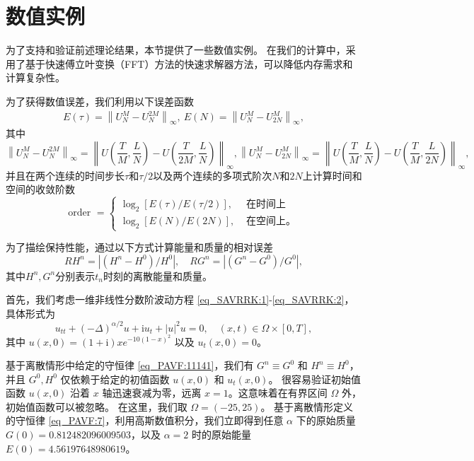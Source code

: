 \section{数值实例}\label{Section_PAVF: 4}
为了支持和验证前述理论结果，本节提供了一些数值实例。
在我们的计算中，采用了基于快速傅立叶变换（FFT）方法的快速求解器方法，可以降低内存需求和计算复杂性。

为了获得数值误差，我们利用以下误差函数
\begin{align}\label{eq_PAVF:103}
E(\tau)=\left\|U_{N}^{M}-U_{N}^{2 M}\right\|_{\infty},~E(N)=\left\|U_{N}^{M}-U_{2 N}^{M}\right\|_{\infty},
\end{align}
其中
$$\left\|U_{N}^{M}-U_{N}^{2 M}\right\|_{\infty}=\left\|U\left(\frac{T}{M}, \frac{L}{N}\right)-U\left(\frac{T}{2 M}, \frac{L}{N}\right)\right\|_{\infty},\left\|U_{N}^{M}-U_{2 N}^{M}\right\|_{\infty}=\left\|U\left(\frac{T}{M}, \frac{L}{N}\right)-U\left(\frac{T}{M}, \frac{L}{2 N}\right)\right\|_{\infty},$$
并且在两个连续的时间步长$\tau$和$\tau / 2$以及两个连续的多项式阶次$N$和$2N$上计算时间和空间的收敛阶数
\begin{equation}
\text { order }= \left\{
\begin{aligned}
\log _{2}[E(\tau) / E(\tau / 2)], & \text { 在时间上 } \\
\log _{2}[E(N) / E(2 N)], & \text { 在空间上。 }
\end{aligned}\right.\label{eq_PAVF:104}
\end{equation}

为了描绘保持性能，通过以下方式计算能量和质量的相对误差
\begin{equation}\label{eq_PAVF:105}
R H^{n}=\left|\left(H^{n}-H^{0}\right) / H^{0}\right|, \quad R G^{n}=\left|\left(G^{n}-G^{0}\right) / G^{0}\right|,
\end{equation}
其中$H^{n}, G^{n}$分别表示$t_n$时刻的离散能量和质量。

\begin{example}\label{exp_PAVF:2}
	首先，我们考虑一维非线性分数阶波动方程 \eqref{eq_SAVRRK:1}-\eqref{eq_SAVRRK:2}，具体形式为
	\begin{equation}\label{eq_PAVF:108}
	u_{t t}+(-\Delta)^{\alpha / 2} u+\mathrm{i}u_t+|u|^2 u=0, \quad (x,t)\in  \Omega\times[0, T],
	\end{equation}
	其中 $u(x, 0)=(1+\mathrm{i}) x e^{-10(1-x)^2}$ 以及 $u_t(x, 0)=0$。
\end{example}
	基于离散情形中给定的守恒律 \eqref{eq_PAVF:11141}，我们有 $G^n\equiv G^0$ 和 $H^n\equiv H^0$，并且 $G^0, H^0$ 仅依赖于给定的初值函数 $u(x,0)$ 和 $u_t(x, 0)$。
	很容易验证初始值函数 $u(x, 0)$ 沿着 $x$ 轴迅速衰减为零，远离 $x=1$。这意味着在有界区间 $\Omega$ 外，初始值函数可以被忽略。 %
	在这里，我们取 $\Omega=(-25,25)$。
	基于离散情形定义的守恒律 \eqref{eq_PAVF:7}，利用高斯数值积分，我们立即得到任意 $\alpha$ 下的原始质量 $G(0)=0.812482096009503$，以及 $\alpha=2$ 时的原始能量 $E(0)=4.56197648980619$。
	
